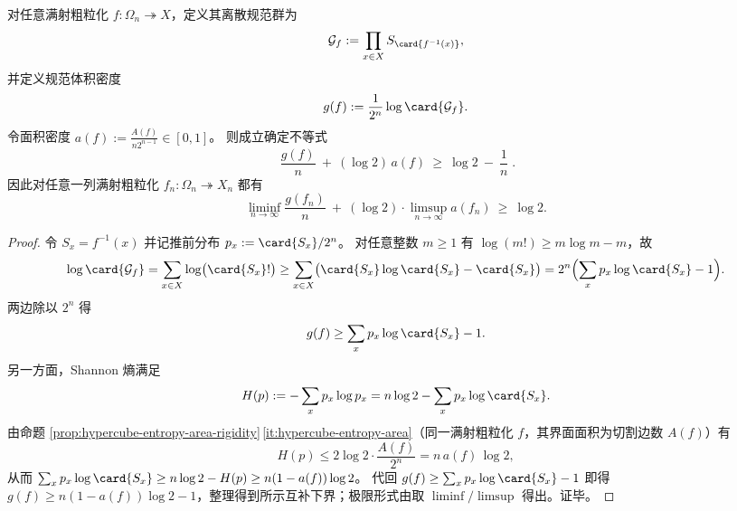 \begin{theorem}[规范体积密度与面积密度的互补下界]\label{thm:spg-gauge-volume-area-complementarity}
对任意满射粗粒化 \(f:\Omega_n\twoheadrightarrow X\)，定义其离散规范群为
\[
\mathcal G_f:=\prod_{x\in X} S_{\card{f^{-1}(x)}},
\]
并定义规范体积密度
\[
g(f):=\frac{1}{2^n}\log\card{\mathcal G_f}.
\]
令面积密度 \(a(f):=\frac{A(f)}{n2^{n-1}}\in[0,1]\)。
则成立确定不等式
\[
\boxed{\;
\frac{g(f)}{n}\ +\ (\log 2)\,a(f)\ \ge\ \log 2\ -\ \frac{1}{n}\; }.
\]
因此对任意一列满射粗粒化 \(f_n:\Omega_n\twoheadrightarrow X_n\) 都有
\[
\liminf_{n\to\infty}\frac{g(f_n)}{n}\ +\ (\log 2)\cdot \limsup_{n\to\infty}a(f_n)\ \ge\ \log 2.
\]
\end{theorem}
\begin{proof}
令 \(S_x=f^{-1}(x)\) 并记推前分布 \(p_x:=\card{S_x}/2^n\)。
对任意整数 \(m\ge 1\) 有 \(\log(m!)\ge m\log m-m\)，故
\[
\log\card{\mathcal G_f}
=\sum_{x\in X}\log\bigl(\card{S_x}!\bigr)
\ge \sum_{x\in X}\bigl(\card{S_x}\log\card{S_x}-\card{S_x}\bigr)
=2^n\Bigl(\sum_x p_x\log\card{S_x}-1\Bigr).
\]
两边除以 \(2^n\) 得
\[
g(f)\ge \sum_x p_x\log\card{S_x}-1.
\]
另一方面，Shannon 熵满足
\[
H(p):=-\sum_x p_x\log p_x
=n\log 2-\sum_x p_x\log\card{S_x}.
\]
由命题 \ref{prop:hypercube-entropy-area-rigidity}\,\ref{it:hypercube-entropy-area}（同一满射粗粒化 \(f\)，其界面面积为切割边数 \(A(f)\)）有
\[
H(p)\le 2\log 2\cdot \frac{A(f)}{2^n}=n\,a(f)\,\log 2,
\]
从而
\(
\sum_x p_x\log\card{S_x}\ge n\log 2-H(p)\ge n(1-a(f))\log 2
\)。
代回 \(g(f)\ge \sum_x p_x\log\card{S_x}-1\) 即得
\(
g(f)\ge n(1-a(f))\log 2-1
\)，整理得到所示互补下界；极限形式由取 \(\liminf/\limsup\) 得出。证毕。
\end{proof}

